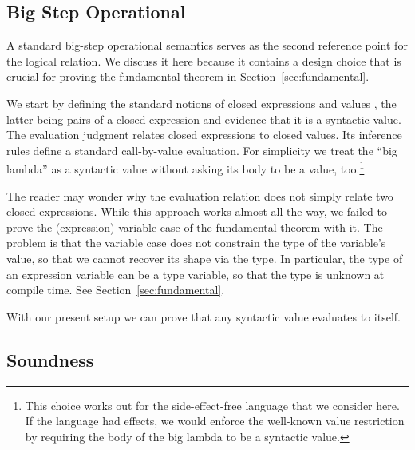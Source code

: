 \documentclass[acmsmall,anonymous,review,screen]{acmart}
\begin{document}
\subsection{Big Step Operational}
\label{sec:big-step-operational}

A standard big-step operational semantics serves as the second
reference point for the logical relation. We discuss it here because
it contains a design choice that is crucial for proving the
fundamental theorem in Section~\ref{sec:fundamental}.

We start by defining the
standard notions of closed expressions {\ACExpr} and values {\AValue}, the latter being
pairs of a closed expression and evidence {\AisValue} that it is a syntactic value.
\BigStepCExpr
\BigStepisValue
\BigStepValue
The evaluation judgment relates closed expressions to closed values.
Its inference rules define a standard call-by-value evaluation.
For simplicity we treat the ``big lambda'' as a syntactic value
without asking its body to be a value, too.\footnote{This choice works out for the
  side-effect-free language that we consider here. If the language had
  effects, we would enforce the well-known value restriction by
  requiring the body of the big lambda to be a syntactic value.}
\BigStepSemantics

The reader may wonder why the evaluation relation does not simply relate two closed
expressions. While this approach works almost all the way, we
failed to prove the (expression) variable case of the fundamental theorem with
it. The problem is that the variable case does not constrain the type
of the variable's value, so that we cannot recover its shape via
the {\AisValue} type. In particular, the type of an expression variable can be
a type variable, so that the type is unknown at compile time. See Section~\ref{sec:fundamental}.

With our present setup we can prove that any syntactic value evaluates to itself.
\BigStepValueReduceSelf

\subsection{Soundness}
\label{sec:soundness}
\end{document}
